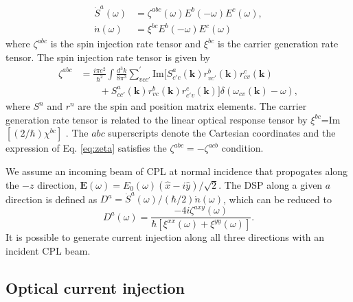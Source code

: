 \documentclass[pss]{wiley2sp} %
\begin{document}
\begin{align*}
\dot{S}^{a}(\omega) &= \zeta^{abc}(\omega)E^{b}(-\omega)E^{c}(\omega), \nonumber \\ 
\dot{n}(\omega)     &= \xi^{bc}E^{b}(-\omega)E^{c}(\omega)
\end{align*}
where $\zeta^{abc}$ is the spin injection rate tensor and $\xi^{bc}$ is the carrier generation rate tensor. The spin injection rate tensor is given by
\begin{align}\label{eq:zeta}
\zeta^{abc} &= \frac{i\pi e^{2}}{\hbar^{2}}\int\frac{d^{3}k}{8\pi^{3}}
\sum_{vcc'}^{\prime}\text{Im}\bigl[S^{a}_{c'c}(\textbf{k})
r^{b}_{vc'}(\textbf{k})r^{c}_{cv}(\textbf{k})\nonumber\\
&\qquad+S^{a}_{cc'}(\textbf{k})
r^{b}_{vc}(\textbf{k})r^{c}_{c'v}(\textbf{k})\bigr]
\delta(\omega_{cv}(\textbf{k})-\omega),
\end{align}
where $S^{n}$ and $r^{n}$ are the spin and position matrix elements. The carrier generation rate tensor is related to the linear optical response tensor by $\xi^{bc}$=Im$[(2/\hbar)\chi^{bc}]$ . The $abc$ superscripts denote the Cartesian coordinates and the expression of Eq. \eqref{eq:zeta} satisfies the $\zeta^{abc} = -\zeta^{acb}$ condition.

We assume an incoming beam of CPL at normal incidence that propogates along the $-z$ direction, $\mathbf{E}(\omega) = E_{0}(\omega)(\hat{x} - i\hat{y})/\sqrt{2}$. The DSP along a given $a$ direction is defined as $D^{a}=\dot{S}^{a}(\omega)/(\hbar/2)\dot{n}(\omega)$, which can be reduced to 
\begin{equation}\label{eq:D^i}
D^{a}(\omega) = 
\frac{-4i\zeta^{axy}(\omega)}
    {\hbar\left[\xi^{xx}(\omega) + \xi^{yy}(\omega)\right]}.
\end{equation}
It is possible to generate current injection along all three directions with
an incident CPL beam.


\subsection{Optical current injection}\label{sec:theory-OCI}
\end{document}
